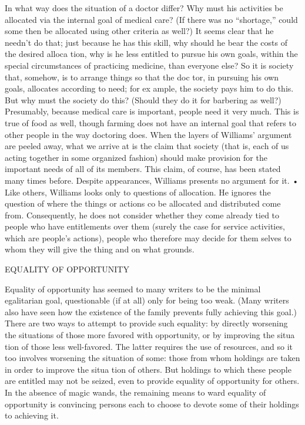 \documentclass[11pt,openany]{book}
\begin{document}
In what way does the situation of a doctor differ? Why must his activities be allocated via the internal goal of medical care? (If there was no ``shortage,'' could some then be allocated using other criteria as well?) It seems clear that he needn't do that; just because he has this skill, why should he bear the costs of the desired alloca tion, why is he less entitled to pursue his own goals, within the special circumstances of practicing medicine, than everyone else? So it is society that, somehow, is to arrange things so that the doc tor, in pursuing his own goals, allocates according to need; for ex ample, the society pays him to do this. But why must the society do this? (Should they do it for barbering as well?) Presumably, because medical care is important, people need it very much. This is true of food as well, though farming does not have an internal goal that refers to other people in the way doctoring does. When the layers of Williams' argument are peeled away, what we arrive at is the claim that society (that is, each of us acting together in some organized fashion) should make provision for the important needs of all of its members. This claim, of course, has been stated many times before. Despite appearances, Williams presents no argument for it. • Like others, Williams looks only to questions of allocation. He ignores the question of where the things or actions co be allocated and distributed come from. Consequently, he does not consider whether they come already tied to people who have entitlements over them (surely the case for service activities, which are people's actions), people who therefore may decide for them selves to whom they will give the thing and on what grounds. 

EQUALITY OF OPPORTUNITY 

Equality of opportunity has seemed to many writers to be the minimal egalitarian goal, questionable (if at all) only for being too weak. (Many writers also have seen how the existence of the family prevents fully achieving this goal.) There are two ways to attempt to provide such equality: by directly worsening the situations of those more favored with opportunity, or by improving the situa tion of those less well-favored. The latter requires the use of resources, and so it too involves worsening the situation of some: those from whom holdings are taken in order to improve the situa tion of others. But holdings to which these people are entitled may not be seized, even to provide equality of opportunity for others. In the absence of magic wands, the remaining means to ward equality of opportunity is convincing persons each to choose to devote some of their holdings to achieving it. 
\end{document}
